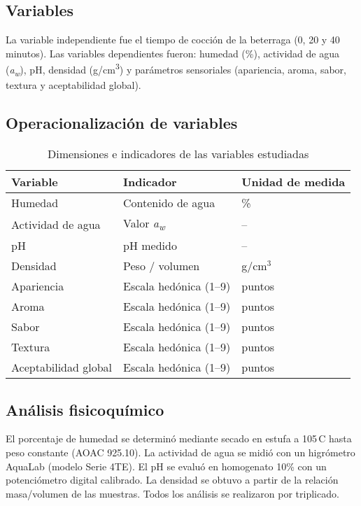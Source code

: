 \documentclass[manuscript,screen,review]{acmart}
\begin{document}
\subsection{Variables}
La variable independiente fue el tiempo de cocción de la beterraga (0, 20 y 40 minutos). Las variables dependientes fueron: humedad (\%), actividad de agua (\textit{a\textsubscript{w}}), pH, densidad (g/cm\textsuperscript{3}) y parámetros sensoriales (apariencia, aroma, sabor, textura y aceptabilidad global).

\subsection{Operacionalización de variables}
\begin{table}[h]
\centering
\caption{Dimensiones e indicadores de las variables estudiadas}
\begin{tabular}{lll}
\hline
\textbf{Variable} & \textbf{Indicador} & \textbf{Unidad de medida} \\
\hline
Humedad & Contenido de agua & \% \\
Actividad de agua & Valor \textit{a\textsubscript{w}} & -- \\
pH & pH medido & -- \\
Densidad & Peso / volumen & g/cm$^3$ \\
Apariencia & Escala hedónica (1--9) & puntos \\
Aroma & Escala hedónica (1--9) & puntos \\
Sabor & Escala hedónica (1--9) & puntos \\
Textura & Escala hedónica (1--9) & puntos \\
Aceptabilidad global & Escala hedónica (1--9) & puntos \\
\hline
\end{tabular}
\end{table}

\subsection{Análisis fisicoquímico}
El porcentaje de humedad se determinó mediante secado en estufa a 105\,\textdegree C hasta peso constante (AOAC 925.10). La actividad de agua se midió con un higrómetro AquaLab (modelo Serie 4TE). El pH se evaluó en homogenato 10\% con un potenciómetro digital calibrado. La densidad se obtuvo a partir de la relación masa/volumen de las muestras. Todos los análisis se realizaron por triplicado.
\end{document}

